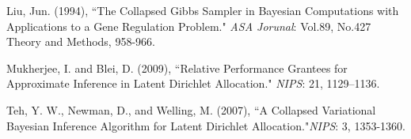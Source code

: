 \documentclass[12pt]{report}
\begin{document}
\begin{thebibliography}{4}
	Liu, Jun.  (1994),
	``The Collapsed Gibbs Sampler in Bayesian Computations with Applications to a Gene Regulation Problem." \textit{ASA Jorunal}: Vol.89, No.427 Theory and Methods, 958-966.
	
	Mukherjee, I. and Blei, D.  (2009),
	``Relative Performance Grantees for Approximate Inference in Latent Dirichlet Allocation." 
	\textit{NIPS}: 21, 1129–1136.
	
	Teh, Y. W., Newman, D., and Welling, M.  (2007),
	``A Collapsed Variational Bayesian Inference Algorithm for Latent Dirichlet 
	Allocation."\textit{NIPS}: 3, 1353-1360.
	
	
	
\end{thebibliography}
\end{document}
